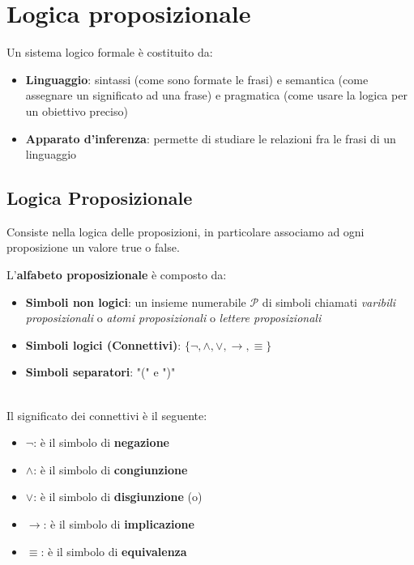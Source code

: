 \chapter{Logica proposizionale}
Un sistema logico formale è costituito da:
\begin{itemize}
    \item \textbf{Linguaggio}: sintassi (come sono formate le frasi) e semantica (come assegnare un significato ad una frase) e 
    pragmatica (come usare la logica per un obiettivo preciso)
    \item \textbf{Apparato d'inferenza}: permette di studiare le relazioni fra le frasi di un linguaggio 
\end{itemize}

\section{Logica Proposizionale}
Consiste nella logica delle proposizioni, in particolare associamo ad ogni proposizione un valore true o false.\smallskip\\
\colorbox{SALZO}{\parbox{\dimexpr\linewidth-2\fboxsep}{\begin{definition}
   L'\textbf{alfabeto proposizionale} è composto da:
   \begin{itemize}
    \item \textbf{Simboli non logici}: un insieme numerabile $\mathcal{P}$ di simboli chiamati \textit{varibili proposizionali} o \textit{atomi proposizionali} o 
   \textit{lettere proposizionali }
   \item \textbf{Simboli logici (Connettivi)}: $\{ \neg, \wedge,\vee,\to, \equiv \}$
   \item \textbf{Simboli separatori}: "(" e ")"
   \end{itemize} 
\end{definition}}}\smallskip\\
Il significato dei connettivi è il seguente:
   \begin{itemize}[label = --]
    \item $\bm{\neg}$: è il simbolo di \textbf{negazione}
    \item $\bm{\wedge}$: è il simbolo di \textbf{congiunzione}
    \item $\bm{\vee}$: è il simbolo di \textbf{disgiunzione} (o)
    \item $\bm{\to}$: è il simbolo di \textbf{implicazione}
    \item $\bm{\equiv}$: è il simbolo di \textbf{equivalenza}
   \end{itemize}
